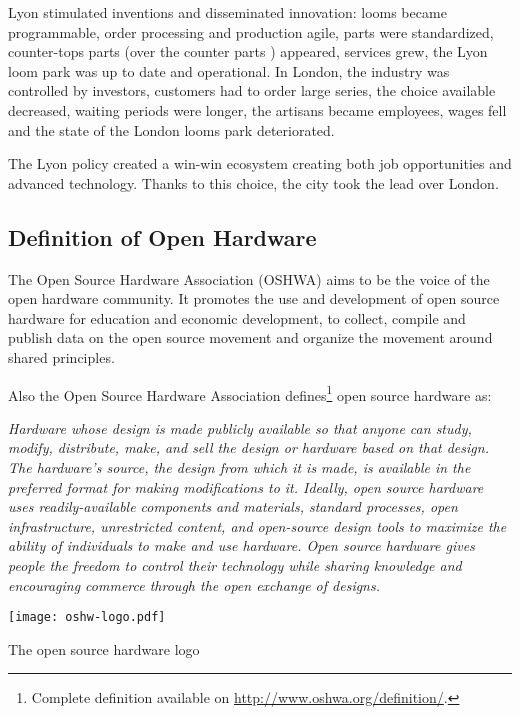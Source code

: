 Lyon stimulated inventions and disseminated innovation: looms became programmable, order processing and production agile, parts were standardized, counter-tops parts (over the counter parts ) appeared, services grew, the Lyon loom park was up to date and operational.
In London, the industry was controlled by investors, customers had to order large series, the choice available decreased, waiting periods were longer, the artisans became employees, wages fell and the state of the London looms park deteriorated.

The Lyon policy created a win-win ecosystem creating both job opportunities and advanced technology. Thanks to this choice, the city took the lead over London.

\subsection{Definition of Open Hardware } %

The Open Source Hardware Association (OSHWA) aims to be the voice of the open hardware community. It promotes the use and development of open source hardware for education and economic development, to collect, compile and publish data on the open source movement and organize the movement around shared principles.

Also the Open Source Hardware Association defines\footnote{Complete definition available on \url{http://www.oshwa.org/definition/}.} open source hardware as:

\begin{row}{4}{2}
    \begin{cell}{3}
        \emph{Hardware whose design is made publicly available so that anyone can study, modify, distribute, make, and sell the design or hardware based on that design. The hardware’s source, the design from which it is made, is available in the preferred format for making modifications to it. Ideally, open source hardware uses readily-available components and materials, standard processes, open infrastructure, unrestricted content, and open-source design tools to maximize the ability of individuals to make and use hardware. Open source hardware gives people the freedom to control their technology while sharing knowledge and encouraging commerce through the open exchange of designs.}
    \end{cell}
    \begin{cell}{1}
        \begin{NFfigure}
            \centering
                \texttt{[image: oshw-logo.pdf]}
            \caption{The open source hardware logo}
            \label{fig:ohw-logo}
        \end{NFfigure}
    \end{cell}
\end{row}


